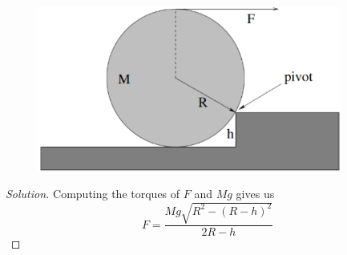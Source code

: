 \begin{figure}[H]
    \centering
    \includegraphics[width=10cm]{images/Cylinder_moment.png}
\end{figure}

\begin{proof}[Solution]
Computing the torques of $F$ and $Mg$ gives us 
\[ \boxed{F=\frac{Mg\sqrt{R^2-(R-h)^2}}{2R-h}} \]
\end{proof}

\pagebreak